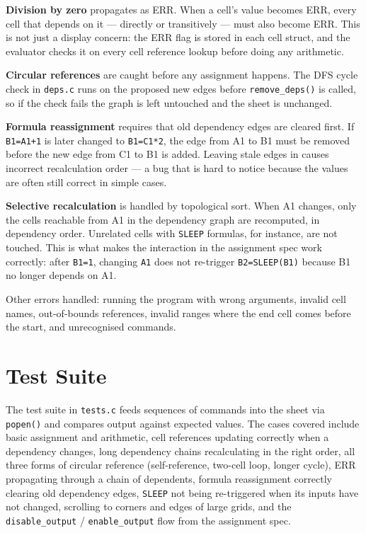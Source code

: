 \documentclass[11pt,a4paper]{article}
\begin{document}
\textbf{Division by zero} propagates as ERR. When a cell's value becomes ERR, every cell that depends on it --- directly or transitively --- must also become ERR. This is not just a display concern: the ERR flag is stored in each cell struct, and the evaluator checks it on every cell reference lookup before doing any arithmetic.

\textbf{Circular references} are caught before any assignment happens. The DFS cycle check in \texttt{deps.c} runs on the proposed new edges before \texttt{remove\_deps()} is called, so if the check fails the graph is left untouched and the sheet is unchanged.

\textbf{Formula reassignment} requires that old dependency edges are cleared first. If \texttt{B1=A1+1} is later changed to \texttt{B1=C1*2}, the edge from A1 to B1 must be removed before the new edge from C1 to B1 is added. Leaving stale edges in causes incorrect recalculation order --- a bug that is hard to notice because the values are often still correct in simple cases.

\textbf{Selective recalculation} is handled by topological sort. When A1 changes, only the cells reachable from A1 in the dependency graph are recomputed, in dependency order. Unrelated cells with \texttt{SLEEP} formulas, for instance, are not touched. This is what makes the interaction in the assignment spec work correctly: after \texttt{B1=1}, changing \texttt{A1} does not re-trigger \texttt{B2=SLEEP(B1)} because B1 no longer depends on A1.

Other errors handled: running the program with wrong arguments, invalid cell names, out-of-bounds references, invalid ranges where the end cell comes before the start, and unrecognised commands.

\section{Test Suite}

The test suite in \texttt{tests.c} feeds sequences of commands into the sheet via \texttt{popen()} and compares output against expected values. The cases covered include basic assignment and arithmetic, cell references updating correctly when a dependency changes, long dependency chains recalculating in the right order, all three forms of circular reference (self-reference, two-cell loop, longer cycle), ERR propagating through a chain of dependents, formula reassignment correctly clearing old dependency edges, \texttt{SLEEP} not being re-triggered when its inputs have not changed, scrolling to corners and edges of large grids, and the \texttt{disable\_output} / \texttt{enable\_output} flow from the assignment spec.
\end{document}
